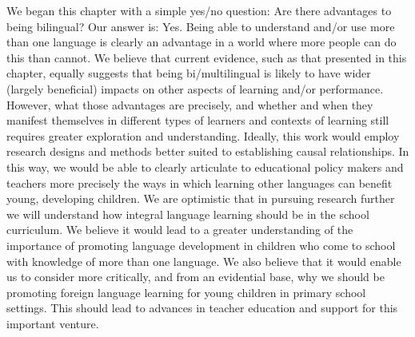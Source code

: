 \documentclass[output=paper]{langscibook}
\begin{document}
We began this chapter with a simple yes/no question: Are there advantages to being bilingual? Our answer is: Yes. Being able to understand and/or use more than one language is clearly an advantage in a world where more people can do this than cannot. We believe that current evidence, such as that presented in this chapter, equally suggests that being bi/multilingual is likely to have wider (largely beneficial) impacts on other aspects of learning and/or performance. However, what those advantages are precisely, and whether and when they manifest themselves in different types of learners and contexts of learning still requires greater exploration and understanding. Ideally, this  work would employ research designs and methods better suited to establishing causal relationships. In this way, we would be able to clearly articulate to educational policy makers and teachers more precisely the ways in which learning other languages can benefit young, developing children. We are optimistic that in pursuing research further we will understand how integral language learning should be in the school curriculum. We believe it would lead to a greater understanding of the importance of promoting language development in children who come to school with knowledge of more than one language. We also believe that it would enable us to consider more critically, and from an evidential base, why we should be promoting foreign language learning for young children in primary school settings. This should lead to advances in teacher education and support for this important venture.

\sloppy\printbibliography[heading=subbibliography,notkeyword=this]
\end{document}
